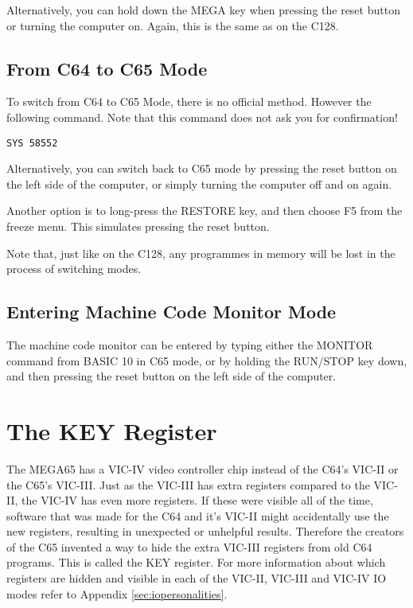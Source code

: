 Alternatively, you can hold down the MEGA key when pressing the reset button or turning the computer on. Again,
this is the same as on the C128.

\subsection{From C64 to C65 Mode}

To switch from C64 to C65 Mode, there is no official method.  However the following command.  Note that this command
does not ask you for confirmation!

\begin{tcolorbox}[colback=black,coltext=white]
\verbatimfont{\codefont}
\begin{verbatim}
SYS 58552
\end{verbatim}
\end{tcolorbox}

Alternatively, you can switch back to C65 mode by pressing the reset
button on the left side of the computer, or simply turning the
computer off and on again.  

Another option is to long-press the RESTORE key, and then choose F5
from the freeze menu.  This simulates pressing the reset button. 

Note that, just like on the C128, any programmes in memory will be
lost in the process of switching modes. 

\subsection{Entering Machine Code Monitor Mode}

The machine code monitor can be entered by typing either the MONITOR
command from BASIC 10 in C65 mode, or by holding the RUN/STOP key
down, and then pressing the reset button on the left side of the
computer. 

\section{The KEY Register}

The MEGA65 has a VIC-IV video controller chip instead of the C64's VIC-II or
the C65's VIC-III.  Just as the VIC-III has extra registers compared to the
VIC-II, the VIC-IV has even more registers.  If these were visible all of the time,
software that was made for the C64 and it's VIC-II might accidentally use the
new registers, resulting in unexpected or unhelpful results.  Therefore the
creators of the C65 invented a way to hide the extra VIC-III registers from old
C64 programs. This is called the KEY register. For more information
about which registers are hidden and visible in each of the
VIC-II, VIC-III and VIC-IV IO modes refer to Appendix \ref{sec:iopersonalities}.

